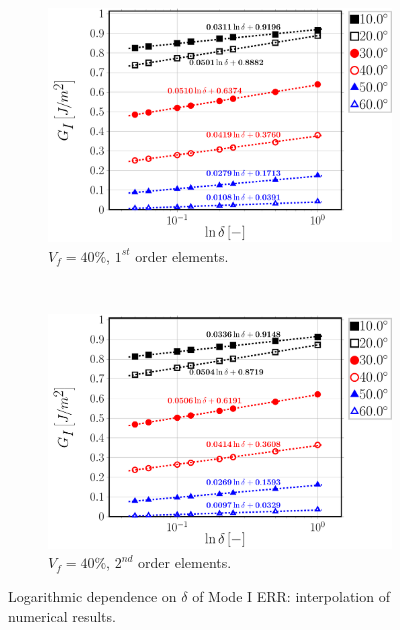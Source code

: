 \begin{figure}[!h]
    \begin{subfigure}[b]{0.45\textwidth}
        \includegraphics[width=\textwidth]{paperA/Vf40-free-1st-semilogvsDelta-GI.pdf}
       \caption{$V_{f}=40\%$, $1^{st}$ order elements.}
    \end{subfigure}
    ~
    \begin{subfigure}[b]{0.45\textwidth}
        \includegraphics[width=\textwidth]{paperA/Vf40-free-2nd-semilogvsDelta-GI.pdf}
       \caption{$V_{f}=40\%$, $2^{nd}$ order elements.}
    \end{subfigure}

\caption{Logarithmic dependence on $\delta$ of Mode I ERR: interpolation of numerical results.}\label{chap3:paperA:fig:gIinterp}
\end{figure}

